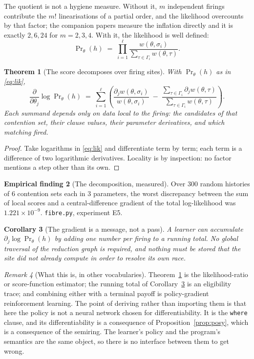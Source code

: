 \documentclass[11pt,a4paper]{article}
\theoremstyle{plain}
\newtheorem{theorem}{Theorem}[section]
\newtheorem{corollary}[theorem]{Corollary}
\theoremstyle{definition}
\newtheorem{finding}[theorem]{Empirical finding}
\theoremstyle{remark}
\newtheorem{remark}[theorem]{Remark}
\begin{document}
The quotient is not a hygiene measure. Without it, $m$ independent firings
contribute the $m!$ linearisations of a partial order, and the likelihood
overcounts by that factor; the companion papers measure the inflation directly
and it is exactly $2, 6, 24$ for $m=2,3,4$. With it, the likelihood is well
defined:
\begin{equation}\label{eq:lik}
\Pr\nolimits_\theta(h) \;=\; \prod_{i=1}^{\ell}
\frac{w(\theta,\sigma_i)}{\sum_{\tau \in \Gamma_i} w(\theta,\tau)} .
\end{equation}

\begin{theorem}[The score decomposes over firing sites]\label{thm:score}
With $\Pr_\theta(h)$ as in \eqref{eq:lik},
\[
\frac{\partial}{\partial \theta_j}\log \Pr\nolimits_\theta(h)
\;=\;
\sum_{i=1}^{\ell}
\left(
\frac{\partial_j w(\theta,\sigma_i)}{w(\theta,\sigma_i)}
\;-\;
\frac{\sum_{\tau\in\Gamma_i}\partial_j w(\theta,\tau)}
     {\sum_{\tau\in\Gamma_i} w(\theta,\tau)}
\right).
\]
Each summand depends only on data local to the firing: the candidates of that
contention set, their clause values, their parameter derivatives, and which
matching fired.
\end{theorem}

\begin{proof}
Take logarithms in \eqref{eq:lik} and differentiate term by term; each term is a
difference of two logarithmic derivatives. Locality is by inspection: no factor
mentions a step other than its own.
\end{proof}

\begin{finding}[The decomposition, measured]\label{find:score}
Over $300$ random histories of $6$ contention sets each in $3$ parameters, the
worst discrepancy between the sum of local scores and a central-difference
gradient of the total log-likelihood was $1.221\times10^{-9}$. \texttt{fibre.py},
experiment E5.
\end{finding}

\begin{corollary}[The gradient is a message, not a pass]\label{cor:local}
A learner can accumulate $\partial_j \log \Pr_\theta(h)$ by adding one number per
firing to a running total. No global traversal of the reduction graph is
required, and nothing must be stored that the site did not already compute in
order to resolve its own race.
\end{corollary}

\begin{remark}[What this is, in other vocabularies]\label{rem:reinforce}
Theorem~\ref{thm:score} is the likelihood-ratio or score-function estimator; the
running total of Corollary~\ref{cor:local} is an eligibility trace; and combining
either with a terminal payoff is policy-gradient reinforcement learning. The
point of deriving rather than importing them is that here the policy is not a
neural network chosen for differentiability. It is the \texttt{where} clause, and
its differentiability is a consequence of Proposition~\ref{prop:posy}, which is a
consequence of the semiring. The learner's policy and the program's semantics are
the same object, so there is no interface between them to get wrong.
\end{remark}
\end{document}
